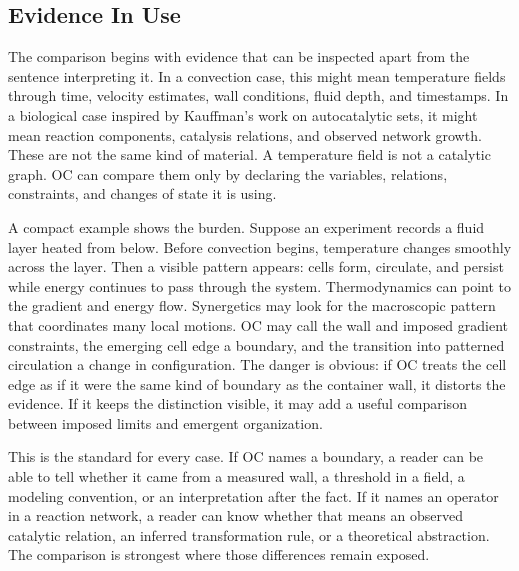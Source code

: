 \documentclass[11pt,a4paper,openany]{book}
\begin{document}
\subsection{Evidence In Use}
The comparison begins with evidence that can be inspected apart from the sentence interpreting it. In a convection case, this might mean temperature fields through time, velocity estimates, wall conditions, fluid depth, and timestamps. In a biological case inspired by Kauffman's work on autocatalytic sets, it might mean reaction components, catalysis relations, and observed network growth. These are not the same kind of material. A temperature field is not a catalytic graph. OC can compare them only by declaring the variables, relations, constraints, and changes of state it is using. \cite{prigogine_dissipative,haken_synergetics}\par
A compact example shows the burden. Suppose an experiment records a fluid layer heated from below. Before convection begins, temperature changes smoothly across the layer. Then a visible pattern appears: cells form, circulate, and persist while energy continues to pass through the system. Thermodynamics can point to the gradient and energy flow. Synergetics may look for the macroscopic pattern that coordinates many local motions. OC may call the wall and imposed gradient constraints, the emerging cell edge a boundary, and the transition into patterned circulation a change in configuration. The danger is obvious: if OC treats the cell edge as if it were the same kind of boundary as the container wall, it distorts the evidence. If it keeps the distinction visible, it may add a useful comparison between imposed limits and emergent organization.\par
This is the standard for every case. If OC names a boundary, a reader can be able to tell whether it came from a measured wall, a threshold in a field, a modeling convention, or an interpretation after the fact. If it names an operator in a reaction network, a reader can know whether that means an observed catalytic relation, an inferred transformation rule, or a theoretical abstraction. The comparison is strongest where those differences remain exposed.\par
\end{document}
